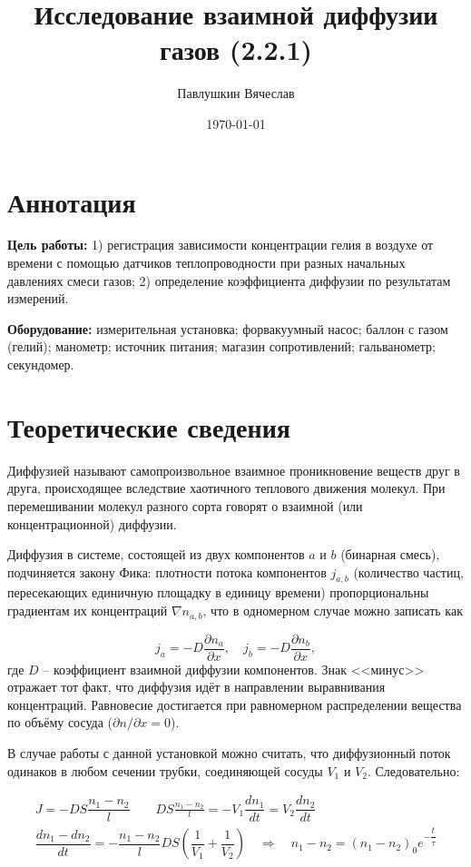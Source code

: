 \documentclass[a4paper,12pt]{article}
\title{Исследование взаимной диффузии газов (2.2.1)}
\author{Павлушкин Вячеслав}
\date{\today}
\theoremstyle{definition}
\begin{document}
	
	\maketitle
	
	\section{Аннотация}
	
		\noindent\textbf{Цель работы:} 1) регистрация зависимости концентрации гелия
		в воздухе от времени с помощью датчиков теплопроводности при
		разных начальных давлениях смеси газов; 2) определение коэффициента диффузии по результатам измерений.
		\bigskip
		
		\noindent \textbf{Оборудование:} измерительная установка; форвакуумный насос; баллон с газом (гелий); манометр; источник питания;
		магазин сопротивлений; гальванометр; секундомер.
		
	\section{Теоретические сведения}
	
		Диффузией называют самопроизвольное взаимное проникновение веществ друг в друга, происходящее вследствие хаотичного теплового движения молекул. При перемешивании молекул разного сорта говорят о взаимной (или концентрационной) диффузии.
		
		Диффузия в системе, состоящей из двух компонентов $ a $ и $ b $ (бинарная смесь), подчиняется закону Фика: плотности потока компонентов $ j_{a,b} $ (количество частиц, пересекающих единичную площадку в единицу времени) пропорциональны градиентам их концентраций $ \nabla n_{a,b}$, что в одномерном случае можно записать как
		
		\[ j_a = -D\dfrac{\partial n_a}{\partial x}, \quad j_b = -D\dfrac{\partial n_b}{\partial x}, \]
		где $ D $ -- коэффициент взаимной диффузии компонентов. Знак <<минус>> отражает тот факт, что диффузия идёт в направлении выравнивания концентраций. Равновесие достигается при равномерном распределении вещества по объёму сосуда ($ \partial n / \partial x = 0 $).
		
		В случае работы с данной установкой можно считать, что диффузионный поток одинаков в любом сечении трубки, соединяющей сосуды $V_1$ и $V_2$. Следовательно:
		
		\begin{align}
			J = -DS\dfrac{n_1-n_2}{l} \qquad DS\frac{n_1-n_2}{l} = -V_1\dfrac{dn_1}{dt} = V_2\dfrac{dn_2}{dt} \\
			\dfrac{dn_1 - dn_2}{dt} = -\dfrac{n_1-n_2}{l}DS\left(\dfrac{1}{V_1}+\dfrac{1}{V_2}\right) \quad\Rightarrow\quad n_1-n_2 = (n_1-n_2)_0e^{-\dfrac{t}{\tau}}
		\end{align}
		
\end{document}

